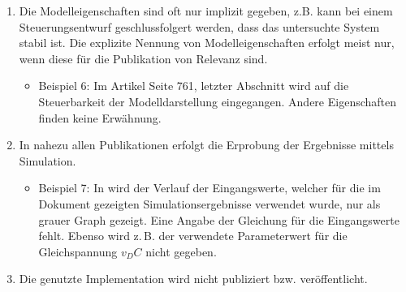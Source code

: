 \begin{enumerate}
\begin{itemize}[label=$\bullet$]
		\item Beispiel 3: In \cite{SILEEA12} Seite 14 werden die Gleichungen des Modells als Gleichungssystem von gewöhnlichen Differentialgleichungen(DGLn) erster Ordnung dargestellt. Die Gleichungen sind jedoch nicht wie üblich umgestellt\footnote{Üblicherweise werden die Modellgleichungen so umgestellt, das sich die Zeitableitungen der Zustände möglichst allein auf der linken Seite und das sich die restlichen Variablen und nicht-abgeleiteten Zustände auf der rechten Seite der Gleichung befinden.}, denn auf der linken Seite der Gleichungen befinden sich Summen aus Zeitableitungen und nicht-abgeleiteten Zustandsgrößen.
		\item Beispiel 4: In \cite{BUT21} Seite 3 besteht das mathematische Modell des Systems aus einer gewöhnlichen DGL zweiter Ordnung
		\item Beispiel 5: In \cite{KNO16} Seite 168f, Beispiel B.3 besteht das mathematische Modell des betrachteten Systems aus einem gewöhnlichen Differentialgleichungssystem zweiter Ordnung, wobei wie in Bsp. 3 diese nicht wie üblich umgestellt worden sind.
	\end{itemize}
	\item  Die Modelleigenschaften sind oft nur implizit gegeben, z.B. kann bei einem Steuerungsentwurf geschlussfolgert werden, dass das untersuchte System stabil ist. Die explizite Nennung von Modelleigenschaften erfolgt meist nur, wenn diese für die Publikation von Relevanz sind. 
	\begin{itemize}[label=$\bullet$]
		\item Beispiel 6: Im Artikel \cite{PEGUEA16} Seite 761, letzter Abschnitt wird auf die Steuerbarkeit der Modelldarstellung eingegangen. Andere Eigenschaften finden keine Erwähnung.
	\end{itemize}
	\item In nahezu allen Publikationen erfolgt die Erprobung der Ergebnisse mittels Simulation. 
	\begin{itemize}[label=$\bullet$]
		\item Beispiel 7: In \cite{BUT21} wird der Verlauf der Eingangswerte, welcher für die im Dokument gezeigten Simulationsergebnisse verwendet wurde, nur als grauer Graph gezeigt. Eine Angabe der Gleichung für die Eingangswerte fehlt. Ebenso wird z.\,B. der verwendete Parameterwert für die Gleichspannung $v_DC$ nicht gegeben.
	\end{itemize}
	\item Die genutzte Implementation wird nicht publiziert bzw. veröffentlicht.
\end{enumerate}

